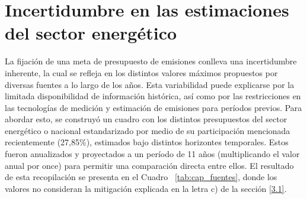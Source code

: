 \section{Incertidumbre en las estimaciones del sector energético}
La fijación de una meta de presupuesto de emisiones conlleva una incertidumbre inherente, la cual se refleja en los distintos valores máximos propuestos por diversas fuentes a lo largo de los años. Esta variabilidad puede explicarse por la limitada disponibilidad de información histórica, así como por las restricciones en las tecnologías de medición y estimación de emisiones para períodos previos. Para abordar esto, se construyó un cuadro con los distintos presupuestos del sector energético o nacional estandarizado por medio de su participación mencionada recientemente (27,85\%), estimados bajo distintos horizontes temporales. Estos fueron anualizados y proyectados a un período de 11 años (multiplicando el valor anual por once) para permitir una comparación directa entre ellos. El resultado de esta recopilación se presenta en el Cuadro ~\ref{tab:cap_fuentes}, donde los valores no consideran la mitigación explicada en la letra c) de la sección \ref{3.1}.

